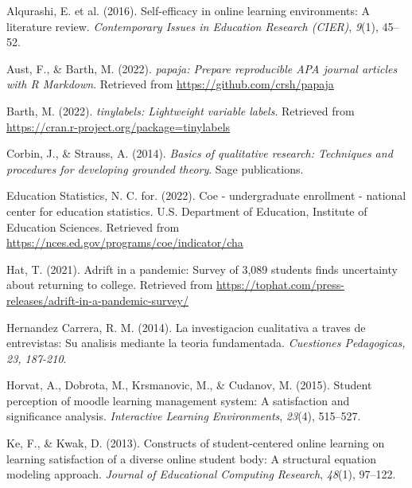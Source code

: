 \documentclass[
  man]{apa6}
\newlength{\cslhangindent}
\newlength{\cslentryspacingunit} %
\newenvironment{CSLReferences}[2] %
 {%
  \setlength{\parindent}{0pt}
  \ifodd #1
  \let\oldpar\par
  \def\par{\hangindent=\cslhangindent\oldpar}
  \fi
  \setlength{\parskip}{#2\cslentryspacingunit}
 }%
 {}
\begin{document}
\hypertarget{refs}{}
\begin{CSLReferences}{1}{0}
\leavevmode{}%
Alqurashi, E. et al. (2016). Self-efficacy in online learning environments: A literature review. \emph{Contemporary Issues in Education Research (CIER)}, \emph{9}(1), 45--52.

\leavevmode{}%
Aust, F., \& Barth, M. (2022). \emph{{papaja}: {Prepare} reproducible {APA} journal articles with {R Markdown}}. Retrieved from \url{https://github.com/crsh/papaja}

\leavevmode{}%
Barth, M. (2022). \emph{{tinylabels}: Lightweight variable labels}. Retrieved from \url{https://cran.r-project.org/package=tinylabels}

\leavevmode{}%
Corbin, J., \& Strauss, A. (2014). \emph{Basics of qualitative research: Techniques and procedures for developing grounded theory}. Sage publications.

\leavevmode{}%
Education Statistics, N. C. for. (2022). Coe - undergraduate enrollment - national center for education statistics. U.S. Department of Education, Institute of Education Sciences. Retrieved from \url{https://nces.ed.gov/programs/coe/indicator/cha}

\leavevmode{}%
Hat, T. (2021). Adrift in a pandemic: Survey of 3,089 students finds uncertainty about returning to college. Retrieved from \url{https://tophat.com/press-releases/adrift-in-a-pandemic-survey/}

\leavevmode{}%
Hernandez Carrera, R. M. (2014). La investigacion cualitativa a trav{e}s de entrevistas: Su analisis mediante la teoria fundamentada. \emph{Cuestiones Pedagogicas, 23, 187-210}.

\leavevmode{}%
Horvat, A., Dobrota, M., Krsmanovic, M., \& Cudanov, M. (2015). Student perception of moodle learning management system: A satisfaction and significance analysis. \emph{Interactive Learning Environments}, \emph{23}(4), 515--527.

\leavevmode{}%
Ke, F., \& Kwak, D. (2013). Constructs of student-centered online learning on learning satisfaction of a diverse online student body: A structural equation modeling approach. \emph{Journal of Educational Computing Research}, \emph{48}(1), 97--122.


\end{CSLReferences}
\end{document}
